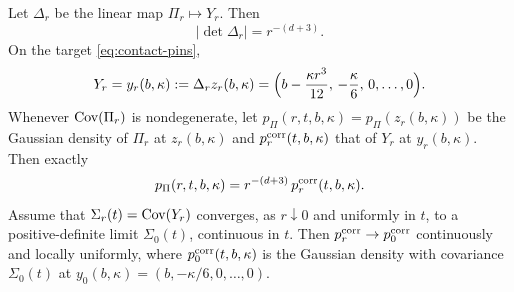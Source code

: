 \begin{lemma}\label{lem:contact-pin-jacobian}
Let $\Delta_r$ be the linear map $\Pi_r\mapsto Y_r$. Then
\begin{equation}\label{eq:contact-detDelta}
|\det\Delta_r|=r^{-(d+3)} .
\end{equation}
On the target \eqref{eq:contact-pins},
\begin{equation}\label{eq:contact-target}
Y_r=y_r(b,\kappa):=\Delta_rz_r(b,\kappa)=\Bigl(b-\frac{\kappa r^3}{12},\,-\frac\kappa6,\,0,\dots,0\Bigr).
\end{equation}
Whenever $\operatorname{Cov}(\Pi_r)$ is nondegenerate, let $p_\Pi(r,t,b,\kappa)=p_\Pi(z_r(b,\kappa))$ be the Gaussian density of $\Pi_r$ at $z_r(b,\kappa)$ and $p^{\rm corr}_r(t,b,\kappa)$ that of $Y_r$ at $y_r(b,\kappa)$. Then exactly
\begin{equation}\label{eq:contact-density}
p_\Pi(r,t,b,\kappa)=r^{-(d+3)}\,p^{\rm corr}_r(t,b,\kappa).
\end{equation}
Assume that $\Sigma_r(t)=\operatorname{Cov}(Y_r)$ converges, as $r\downarrow0$ and uniformly in $t$, to a positive-definite limit $\Sigma_0(t)$, continuous in $t$. Then $p^{\rm corr}_r\to p^{\rm corr}_0$ continuously and locally uniformly, where $p^{\rm corr}_0(t,b,\kappa)$ is the Gaussian density with covariance $\Sigma_0(t)$ at $y_0(b,\kappa)=(b,-\kappa/6,0,\dots,0)$.
\end{lemma}

